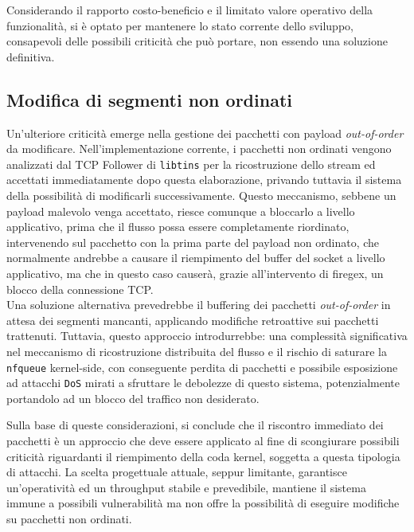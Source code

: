 Considerando il rapporto costo-beneficio e il limitato valore operativo della funzionalità, si è optato per mantenere lo stato corrente dello sviluppo, consapevoli delle possibili criticità che può portare, non essendo una soluzione definitiva.

\subsection{Modifica di segmenti non ordinati}

Un'ulteriore criticità emerge nella gestione dei pacchetti con payload \emph{out-of-order} da modificare. Nell'implementazione corrente, i pacchetti non ordinati vengono analizzati dal TCP Follower di \texttt{libtins} per la ricostruzione dello stream ed accettati immediatamente dopo questa elaborazione, privando tuttavia il sistema della possibilità di modificarli successivamente. Questo meccanismo, sebbene un payload malevolo venga accettato, riesce comunque a bloccarlo a livello applicativo, prima che il flusso possa essere completamente riordinato, intervenendo sul pacchetto con la prima parte del payload non ordinato, che normalmente andrebbe a causare il riempimento del buffer del socket a livello applicativo, ma che in questo caso causerà, grazie all'intervento di firegex, un blocco della connessione TCP.\\

Una soluzione alternativa prevedrebbe il buffering dei pacchetti \emph{out-of-order} in attesa dei segmenti mancanti, applicando modifiche retroattive sui pacchetti trattenuti. Tuttavia, questo approccio introdurrebbe: una complessità significativa nel meccanismo di ricostruzione distribuita del flusso e il rischio di saturare la \texttt{nfqueue} kernel-side, con conseguente perdita di pacchetti e possibile esposizione ad attacchi \texttt{DoS} mirati a sfruttare le debolezze di questo sistema, potenzialmente portandolo ad un blocco del traffico non desiderato.

Sulla base di queste considerazioni, si conclude che il riscontro immediato dei pacchetti è un approccio che deve essere applicato al fine di scongiurare possibili criticità riguardanti il riempimento della coda kernel, soggetta a questa tipologia di attacchi. La scelta progettuale attuale, seppur limitante, garantisce un'operatività ed un throughput stabile e prevedibile, mantiene il sistema immune a possibili vulnerabilità ma non offre la possibilità di eseguire modifiche su pacchetti non ordinati.\\

